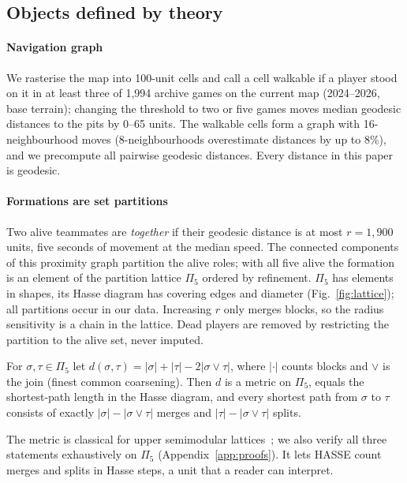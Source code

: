 
\subsection{Objects defined by theory}

\paragraph*{Navigation graph}
We rasterise the map into 100-unit cells and call a cell walkable if a player stood on it in at least three of 1,994 archive games on the current map (2024--2026, base terrain); changing the threshold to two or five games moves median geodesic distances to the pits by 0--65 units.
The walkable cells form a graph with 16-neighbourhood moves (8-neighbourhoods overestimate distances by up to 8\%), and we precompute all pairwise geodesic distances.
Every distance in this paper is geodesic.

\paragraph*{Formations are set partitions}
Two alive teammates are \emph{together} if their geodesic distance is at most $r=1{,}900$ units, five seconds of movement at the median speed.
The connected components of this proximity graph partition the alive roles; with all five alive the formation is an element of the partition lattice $\Pi_5$ ordered by refinement.
$\Pi_5$ has  elements in  shapes, its Hasse diagram has  covering edges and diameter  (Fig.~\ref{fig:lattice}); all  partitions occur in our data.
Increasing $r$ only merges blocks, so the radius sensitivity is a chain in the lattice.
Dead players are removed by restricting the partition to the alive set, never imputed.


\begin{lemma}\label{lem:metric}
For $\sigma,\tau\in\Pi_5$ let $d(\sigma,\tau)=|\sigma|+|\tau|-2|\sigma\vee\tau|$, where $|\cdot|$ counts blocks and $\vee$ is the join (finest common coarsening).
Then $d$ is a metric on $\Pi_5$, equals the shortest-path length in the Hasse diagram, and every shortest path from $\sigma$ to $\tau$ consists of exactly $|\sigma|-|\sigma\vee\tau|$ merges and $|\tau|-|\sigma\vee\tau|$ splits.
\end{lemma}
The metric is classical for upper semimodular lattices~\cite{monjardet1981metrics}; we also verify all three statements exhaustively on $\Pi_5$ (Appendix~\ref{app:proofs}).
It lets HASSE count merges and splits in Hasse steps, a unit that a reader can interpret.

